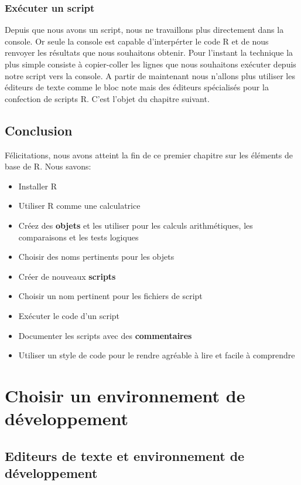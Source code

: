 \documentclass[]{book}
\providecommand{\tightlist}{%
  \setlength{\itemsep}{0pt}\setlength{\parskip}{0pt}}
\theoremstyle{definition}
\theoremstyle{definition}
\theoremstyle{definition}
\theoremstyle{remark}
\begin{document}
\subsection{Exécuter un script}\label{executer-un-script}

Depuis que nous avons un script, nous ne travaillons plus directement
dans la console. Or seule la console est capable d'interpérter le code R
et de nous renvoyer les résultats que nous souhaitons obtenir. Pour
l'instant la technique la plus simple consiste à copier-coller les
lignes que nous souhaitons exécuter depuis notre script vers la console.
A partir de maintenant nous n'allons plus utiliser les éditeurs de texte
comme le bloc note mais des éditeurs spécialisés pour la confection de
scripts R. C'est l'objet du chapitre suivant.

\section{Conclusion}\label{conclusion}

Félicitations, nous avons atteint la fin de ce premier chapitre sur les
éléments de base de R. Nous savons:

\begin{itemize}
\tightlist
\item
  Installer R
\item
  Utiliser R comme une calculatrice
\item
  Créez des \textbf{objets} et les utiliser pour les calculs
  arithmétiques, les comparaisons et les tests logiques
\item
  Choisir des noms pertinents pour les objets
\item
  Créer de nouveaux \textbf{scripts}
\item
  Choisir un nom pertinent pour les fichiers de script
\item
  Exécuter le code d'un script
\item
  Documenter les scripts avec des \textbf{commentaires}
\item
  Utiliser un style de code pour le rendre agréable à lire et facile à
  comprendre
\end{itemize}

\hypertarget{IDE}{\chapter{Choisir un environnement de
développement}\label{IDE}}

\section{Editeurs de texte et environnement de
développement}\label{editeurs-de-texte-et-environnement-de-developpement}
\end{document}
